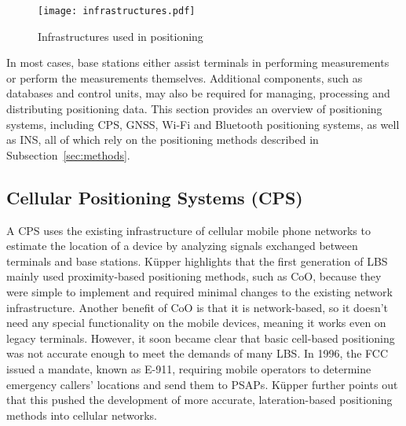\begin{figure}[htbp] 
    \centering 
    \texttt{[image: infrastructures.pdf]} 
    \caption{Infrastructures used in positioning \cite{kupper2005location}} 
    \label{fig:infrastructures} 
\end{figure}

In most cases, base stations either assist terminals in performing measurements or perform the measurements themselves. 
Additional components, such as databases and control units, may also be required for managing, processing and distributing positioning data. 
This section provides an overview of positioning systems, including \ac{CPS}, \acs{GNSS}, \acs{Wi-Fi} and Bluetooth positioning systems, as well as \acs{INS}, all of which rely on the positioning methods described in Subsection~\ref{sec:methods}.



\subsection{Cellular Positioning Systems (CPS)}
A \acs{CPS} uses the existing infrastructure of cellular mobile phone networks to estimate the location of a device by analyzing signals exchanged between terminals and base stations.
K\"upper \cite{kupper2005location} highlights that the first generation of \ac{LBS} mainly used proximity-based positioning methods, such as \acs{CoO}, because they were simple to implement and required minimal changes to the existing network infrastructure.
Another benefit of \acs{CoO} is that it is network-based, so it doesn't need any special functionality on the mobile devices, meaning it works even on legacy terminals.
However, it soon became clear that basic cell-based positioning was not accurate enough to meet the demands of many \acs{LBS}.
In 1996, the \ac{FCC} issued a mandate, known as \ac{E-911}, requiring mobile operators to determine emergency callers' locations and send them to \ac{PSAPs}.
K\"upper \cite{kupper2005location} further points out that this pushed the development of more accurate, lateration-based positioning methods into cellular networks.

